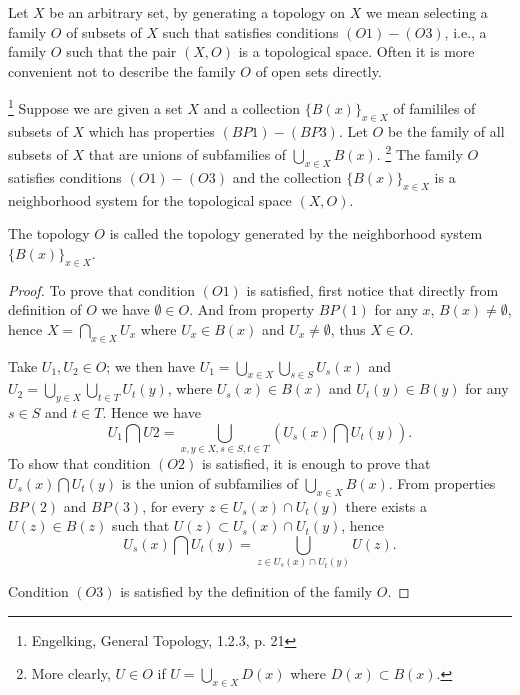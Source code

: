 Let $X$ be an arbitrary set, by generating a topology on $X$ we mean selecting a
family $O$ of subsets of $X$ such that satisfies conditions $(O1)-(O3)$, i.e., a
family $O$ such that the pair $(X,O)$ is a topological space. Often it is more
convenient not to describe the family $O$ of open sets directly.

\begin{proposition} 
\label{P:top_gen}
\footnote{Engelking, General Topology, 1.2.3, p. 21}
Suppose we are given a set $X$ and a collection $\{B(x)\}_{x\in X}$ of famililes
of subsets of $X$ which has properties $(BP1)-(BP3)$. Let $O$ be the family of
all subsets of $X$ that are unions of subfamilies of $\bigcup_{x\in X}B(x)$. 
  \footnote{More clearly, $U\in O$ if $U=\bigcup_{x\in X} D(x)$ where 
    $D(x)\subset B(x)$.}
The family $O$ satisfies conditions $(O1)-(O3)$ and the collection 
$\{B(x)\}_{x\in X}$ is a neighborhood system for the topological space $(X,O)$.

The topology $O$ is called the topology generated by the neighborhood system 
$\{B(x)\}_{x\in X}$.
\end{proposition}
\begin{proof}
To prove that condition $(O1)$ is satisfied, first notice that directly from 
definition of $O$ we have $\emptyset \in O$. And from property
$BP(1)$ for any $x$, $B(x)\neq \emptyset$, hence $X=\bigcap_{x\in X} U_x$ where
$U_x\in B(x)$ and $U_x\neq \emptyset$, thus $X\in O$.

Take $U_1,U_2\in O$; we then have 
$U_1=\bigcup_{x\in X} \bigcup_{s\in S} U_s(x)$ and
$U_2=\bigcup_{y\in X} \bigcup_{t\in T} U_t(y)$, where $U_s(x)\in B(x)$ and 
$U_t(y)\in B(y)$ for any $s\in S$ and $t\in T$. Hence we have
\[
  U_1\bigcap U2 = \bigcup_{x,y\in X, s\in S, t\in T} 
                  \left( U_s(x)\bigcap U_t(y) \right).
\]
To show that condition $(O2)$ is satisfied, it is enough to prove that 
$U_s(x)\bigcap U_t(y)$ is the union of subfamilies of $\bigcup_{x\in X}B(x)$. 
From properties $BP(2)$ and $BP(3)$, for every $z\in U_s(x)\cap U_t(y)$ there
exists a $U(z)\in B(z)$ such that $U(z)\subset U_s(x)\cap U_t(y)$, hence
\[
  U_s(x)\bigcap U_t(y)=\bigcup_{z\in U_s(x)\cap U_t(y)} U(z).
\]

Condition $(O3)$ is satisfied by the definition of the family $O$.
\end{proof}


